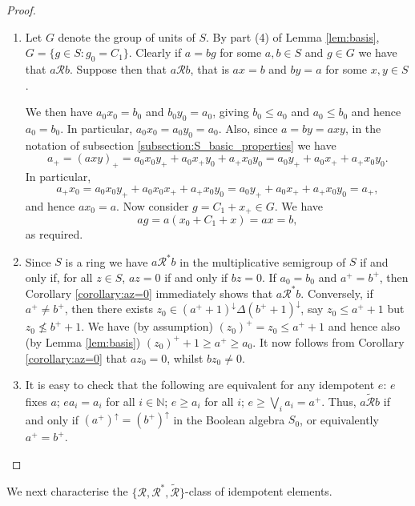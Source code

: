 \documentclass[a4paper, 11pt]{article}
\theoremstyle{plain}
\theoremstyle{definition}
\newcommand{\N} {\mathbb{N}}
\newcommand{\bigjoin}   {\bigvee}
\begin{document}
\begin{proof}
\begin{enumerate}
    \item \label{item:proof_R}
    Let $G$ denote the group of units of $S$. By part (4) of Lemma \ref{lem:basis}, $G = \{g \in S: g_0=C_1\}$. Clearly if $a=bg$ for some $a,b \in S$ and $g \in G$ we have that $a \mathcal{R}b$. Suppose then that $a \mathcal{R}b$, that is $ax=b$ and $by=a$ for some $x,y \in S$. 
 
We then have $a_0 x_0 = b_0$ and  $b_0 y_0 = a_0$, giving $b_0 \leq a_0$ and $a_0 \leq b_0$ and hence $a_0=b_0$. In particular, $a_0x_0=a_0y_0=a_0$. Also, since $a=by=axy$, in the notation of subsection \ref{subsection:S_basic_properties} we have
\[
    a_+ = (axy)_+ = a_0 x_0 y_+ + a_0 x_+ y_0 + a_+ x_0 y_0 = a_0 y_+ + a_0 x_+ + a_+ x_0 y_0.
\]
In particular,
\[
    a_+ x_0 = a_0 x_0 y_+ + a_0 x_0 x_+ + a_+ x_0 y_0 = a_0 y_+ + a_0 x_+ + a_+ x_0 y_0 = a_+,
\]
and hence $ax_0 = a$.
Now consider $g = C_1 + x_+ \in G$. We have
\[
    ag = a(x_0 + C_1 + x) = ax = b,
\]
as required.




    \item \label{item:proof_Rstar}
Since $S$ is a ring we have $a \mathcal{R}^* b$ in the multiplicative semigroup of $S$ if and only if, for all $z \in S$, $az = 0$ if and only if $bz = 0$. If $a_0 = b_0$ and $a^+ = b^+$, then Corollary \ref{corollary:az=0} immediately shows that $a \mathcal{R}^* b$. Conversely, if $a^+ \ne b^+$, then there exists $z_0 \in (a^+ + 1)^\downarrow \Delta (b^+ + 1)^\downarrow$, say $z_0 \le a^+ + 1$ but $z_0 \not\le b^+ + 1$. We have (by assumption) $(z_0)^+ = z_0 \le a^+ + 1$ and hence also (by Lemma \ref{lem:basis}) $(z_0)^+ + 1  \geq  a^+ \geq a_0$. It now follows from Corollary \ref{corollary:az=0} that $a z_0 = 0$, whilst $b z_0 \ne 0$.

    \item \label{item:proof_Rtilde}
It is easy to check that the following are equivalent for any idempotent $e$: $e$ fixes $a$; $e a_i = a_i$ for all $i \in \N$; $e \ge a_i$ for all $i$; $e \ge \bigjoin_i a_i = a^+$. Thus, $a \tilde{\mathcal{R}} b$ if and only if $(a^+)^\uparrow = (b^+)^\uparrow$ in the Boolean algebra $S_0$, or equivalently $a^+ = b^+$.
\end{enumerate}

\end{proof}


We next characterise the $\{ \mathcal{R}, \mathcal{R}^*, \tilde{\mathcal{R}}\}$-class of idempotent elements. 
\end{document}
